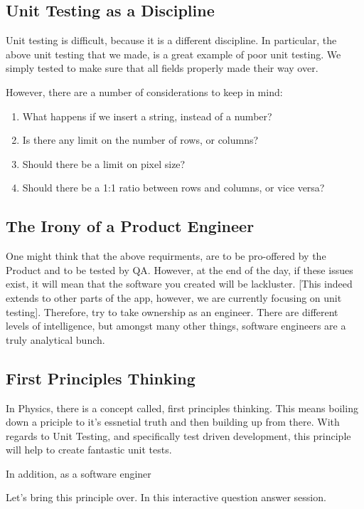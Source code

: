 \subsection{ Unit Testing as a Discipline }

Unit testing is difficult, because it is a different discipline. In particular,
the above unit testing that we made, is a great example of poor unit testing.
We simply tested to make sure that all fields properly made their way over.

However, there are a number of considerations to keep in mind:
\begin{enumerate}
  \item What happens if we insert a string, instead of a number?
  \item Is there any limit on the number of rows, or columns?
  \item Should there be a limit on pixel size?
  \item Should there be a 1:1 ratio between rows and columns, or vice versa?
\end{enumerate}

\subsection{ The Irony of a Product Engineer }
One might think that the above requirments, are to be pro-offered by the Product
and to be tested by QA. However, at the end of the day, if these issues exist,
it will mean that the software you created will be lackluster. [This indeed
extends to other parts of the app, however, we are currently focusing on
unit testing]. Therefore, try to take ownership as an engineer. There are
different levels of intelligence, but amongst many other things, software
engineers are a truly analytical bunch.

\subsection{ First Principles Thinking }

In Physics, there is a concept called, first principles thinking. This means
boiling down a priciple to it's essnetial truth and then building up from there.
With regards to Unit Testing, and specifically test driven development, this
principle will help to create fantastic unit tests.

In addition, as a software enginer

Let's bring this principle over. In this interactive question answer session.

